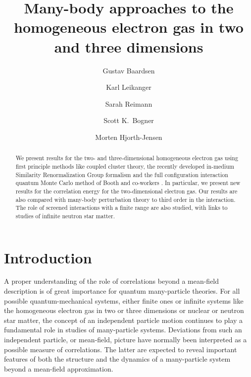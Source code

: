 \documentclass[aps,twocolumn,showpacs,floatfix,nofootinbib,preprintnumbers,superscriptaddress,amsmath,amssymb]{revtex4-1}
\begin{document}
\title{Many-body approaches to the homogeneous electron gas in two and three dimensions}
\author{Gustav Baardsen} 
\author{Karl Leikanger}
\author{Sarah Reimann}
  \author{Scott K.~Bogner} 
\author{Morten Hjorth-Jensen}    


\begin{abstract} 
We present results for the two- and three-dimensional homogeneous electron gas using first principle methods  like coupled cluster theory, 
the recently developed in-medium Similarity Renormalization Group  formalism  and the full configuration interaction quantum Monte Carlo method
of Booth and co-workers \cite{booth2009,shepherd2012a,booth2013}. In particular, we present new results for the correlation energy for the two-dimensional electron gas. 
Our results are also compared with many-body perturbation theory  to third order in the interaction. 
The role of screened interactions with a finite range are also studied, with links to studies
of infinite neutron star matter.  
\end{abstract}


\maketitle

\section{Introduction}
A proper understanding of the role of correlations beyond a mean-field description
is of great importance for quantum many-particle theories. For all possible quantum-mechanical systems, either finite ones or infinite systems like 
the homogeneous electron gas in two or three dimensions or nuclear or neutron star matter,  the concept of an independent  particle motion continues to play  a 
fundamental role in studies of
many-particle systems. 
Deviations from such an independent particle, or mean-field,  picture have normally
been interpreted as a possible measure of correlations.  The latter  are expected to reveal 
important features of both the structure and the dynamics of a many-particle 
system beyond a mean-field approximation. 
\end{document}

